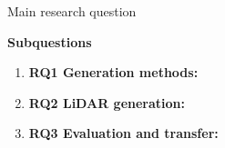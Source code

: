 \begin{researchbox}{Main research question}
\MainResearchQuestion
\end{researchbox}
\textbf{Subquestions}
\begin{enumerate}
\item \textbf{RQ1 Generation methods:} \GenerationQuestion
\item \textbf{RQ2 LiDAR generation:} \LidarQuestion
\item \textbf{RQ3 Evaluation and transfer:} \EvaluationQuestion
\end{enumerate}
